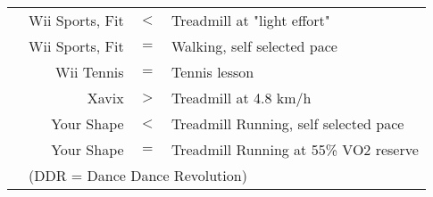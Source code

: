 {\begin{tabular}{lrcl}
\cite{Naugle2014CardiovascularTool}&Wii Sports, Fit&\cellcolor{red!30}$<$&Treadmill at "light effort"\\
\cite{White2011EnergyGames}&Wii Sports, Fit&\cellcolor{yellow!30}$=$&Walking, self selected pace\\
\cite{Staiano2011WiiExpenditure}&Wii Tennis&\cellcolor{yellow!30}$=$&Tennis lesson\\
\cite{Bailey2011EnergyExergaming}&Xavix&\cellcolor{green!30}$>$&Treadmill at 4.8 km/h\\
\cite{Monedero2017EnergyExercise}&Your Shape&\cellcolor{red!30}$<$&Treadmill Running, self selected pace\\
\cite{Monedero2017EnergyExercise}&Your Shape&\cellcolor{yellow!30}$=$&Treadmill Running at 55\% VO2 reserve\\


\hline
& \multicolumn{3}{l}{(DDR = Dance Dance Revolution)}

\end{tabular}
}